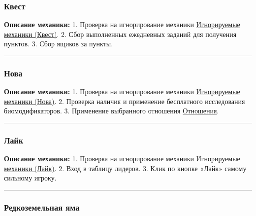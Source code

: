 \documentclass[
]{article}
\begin{document}
\subsubsection{Квест}\label{ux43aux432ux435ux441ux442}

\textbf{Описание механики:} 1. Проверка на игнорирование механики
\hyperref[ignor_states]{Игнорируемые механики (Квест)}. 2. Сбор
выполненных ежедневных заданий для получения пунктов. 3. Сбор ящиков за
пункты.

\begin{center}\rule{0.5\linewidth}{0.5pt}\end{center}

\subsubsection{Нова}\label{ux43dux43eux432ux430}

\textbf{Описание механики:} 1. Проверка на игнорирование механики
\hyperref[ignor_states]{Игнорируемые механики (Нова)}. 2. Проверка
наличия и применение бесплатного исследования биомодификаторов. 3.
Применение выбранного отношения \hyperref[nova_priority]{Отношения}.

\begin{center}\rule{0.5\linewidth}{0.5pt}\end{center}

\subsubsection{Лайк}\label{ux43bux430ux439ux43a}

\textbf{Описание механики:} 1. Проверка на игнорирование механики
\hyperref[ignor_states]{Игнорируемые механики (Лайк)}. 2. Вход в таблицу
лидеров. 3. Клик по кнопке «Лайк» самому сильному игроку.

\begin{center}\rule{0.5\linewidth}{0.5pt}\end{center}

\subsubsection{Редкоземельная
яма}\label{ux440ux435ux434ux43aux43eux437ux435ux43cux435ux43bux44cux43dux430ux44f-ux44fux43cux430}
\end{document}
